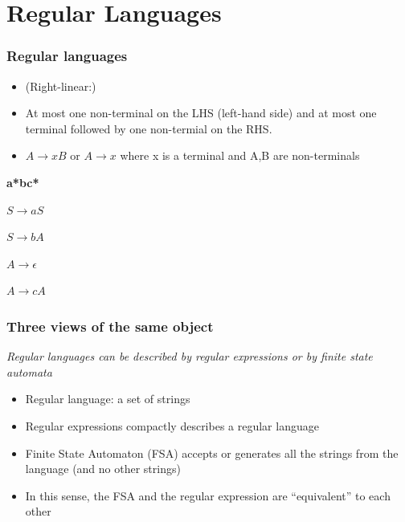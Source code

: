 \documentclass{beamer}
\def\dx{1cm} \def\dy{1.5cm}
\newcommand{\newState}[4]{\node[state,#3](#1)[#4]{#2};}
\newcommand{\newTransition}[4]{\path[->] (#1) edge [#4] node {#3} (#2);}
\begin{document}
\section{Regular Languages}

\begin{frame}
\frametitle{Regular languages}
\begin{itemize}
\item (Right-linear:)
\item At most one non-terminal on the LHS (left-hand side) and at most one terminal followed by one non-termial on the RHS.
\item $A \rightarrow xB$ or $ A \rightarrow x $ where x is a terminal and A,B are non-terminals
\end{itemize}

{\bf a*bc*}

$S \rightarrow aS$
\hspace{3cm}


$S \rightarrow bA$

$A \rightarrow \epsilon$

$A \rightarrow cA$


\end{frame}

\begin{frame}
\frametitle{Three views of the same object}
{\it Regular languages can be described by regular expressions or by finite state automata}
\begin{itemize}
\item Regular language: a set of strings
\item Regular expressions compactly describes a regular language
\item Finite State Automaton (FSA) accepts or generates all the strings from the language (and no other strings)
\item In this sense, the FSA and the regular expression are ``equivalent'' to each other
\end{itemize}

\end{frame}
\end{document}
